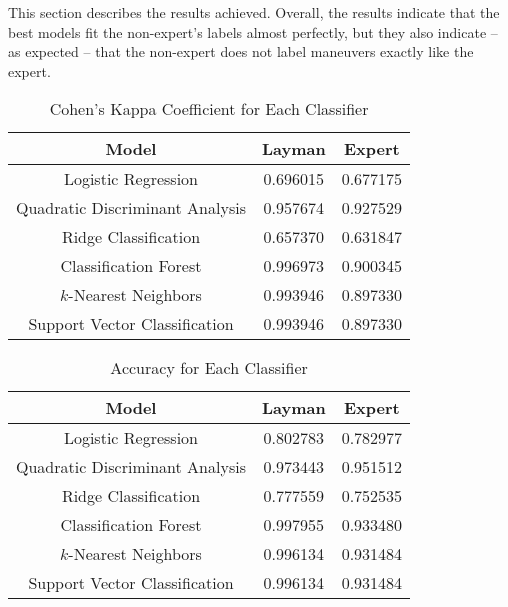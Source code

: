 \documentclass[../main.tex]{subfiles}
\begin{document}

This section describes the results achieved. Overall, the results indicate that the best models fit the non-expert's labels almost perfectly, but they also indicate -- as expected -- that the non-expert does not label maneuvers exactly like the expert.




\begin{table}
\caption{Cohen's Kappa Coefficient for Each Classifier}
\centering
\label{tab:score}
\begin{tabular}{|c|c|c|}
\hline
\textbf{Model}                  & \textbf{Layman} & \textbf{Expert} \\
\hline
Logistic Regression             & 0.696015        & 0.677175        \\
Quadratic Discriminant Analysis & 0.957674        & 0.927529        \\
Ridge Classification            & 0.657370        & 0.631847        \\
Classification Forest           & 0.996973        & 0.900345        \\
$k$-Nearest Neighbors           & 0.993946        & 0.897330        \\
Support Vector Classification   & 0.993946        & 0.897330        \\
\hline
\end{tabular}
\end{table}

\begin{table}
\caption{Accuracy for Each Classifier}
\centering
\label{tab:accuracy}
\begin{tabular}{|c|c|c|}
\hline
\textbf{Model}                  & \textbf{Layman} & \textbf{Expert} \\
\hline
Logistic Regression             & 0.802783        & 0.782977        \\
Quadratic Discriminant Analysis & 0.973443        & 0.951512        \\
Ridge Classification            & 0.777559        & 0.752535        \\
Classification Forest           & 0.997955        & 0.933480        \\
$k$-Nearest Neighbors           & 0.996134        & 0.931484        \\
Support Vector Classification   & 0.996134        & 0.931484        \\
\hline
\end{tabular}
\end{table}
\end{document}

